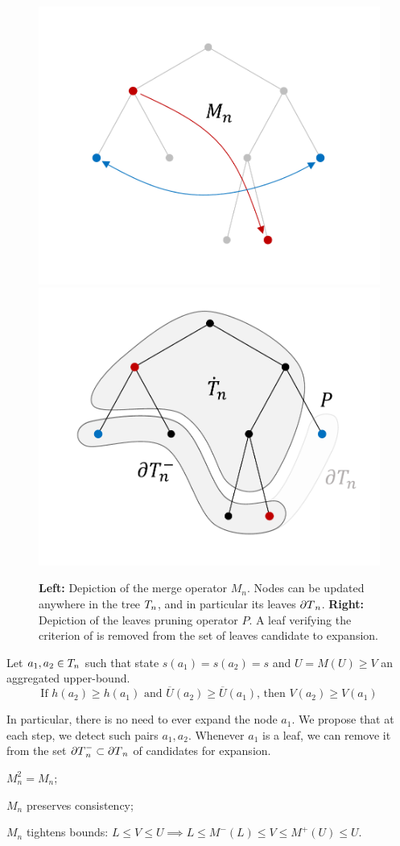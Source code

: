 \documentclass[runningheads]{llncs}
\begin{document}
\begin{figure}[th]
	\centering
	\includegraphics[trim={1.8cm 1.4cm 1.1cm 1.1cm}, clip,width=0.42\linewidth]{img/tree_3}
	\qquad
	\includegraphics[trim={1.8cm 1.4cm 1.1cm 1.1cm}, clip, width=0.42\linewidth]{img/tree_4}
	\caption{\textbf{Left:} Depiction of the merge operator $M_n$. Nodes can be updated anywhere in the tree $T_n$, and in particular its leaves ${\partial T}_n$. \textbf{Right:} Depiction of the leaves pruning operator $P$. A leaf verifying the criterion of  is removed from the set of leaves candidate to expansion.}
	\label{fig:operators}
\end{figure}

\begin{proposition}
\label{prop:pruning}
Let $a_1,a_2\in T_n$ such that state $s(a_1) = s(a_2) = s$ and $U = M(U) \geq V$ an aggregated upper-bound. 
\begin{equation}
\label{eq:pruning}
    \text{If } h(a_2) \geq h(a_1) \text{ and } \overline{U}(a_2) \geq \overline{U}(a_1)
    \text{, then }V(a_2) \geq V(a_1)
\end{equation}

In particular, there is no need to ever expand the node $a_1$. We propose that at each step, we detect such pairs $a_1, a_2$. Whenever $a_1$ is a leaf, we can remove it from the set ${\partial T}_n^-\subset {\partial T}_n $ of candidates for expansion.
\end{proposition}

\begin{lemma}[Properties of $M_n$]
	\begin{enumerate*}[label=(\roman*)]
		\item $M_n^2=M_n$;
		\item $M_n$ preserves consistency;
		\item $M_n$ tightens bounds:
		$
		L\leq V \leq U \implies L\leq M^-(L) \leq V \leq M^+(U) \leq U.
		$
	\end{enumerate*}
\end{lemma}
\end{document}
